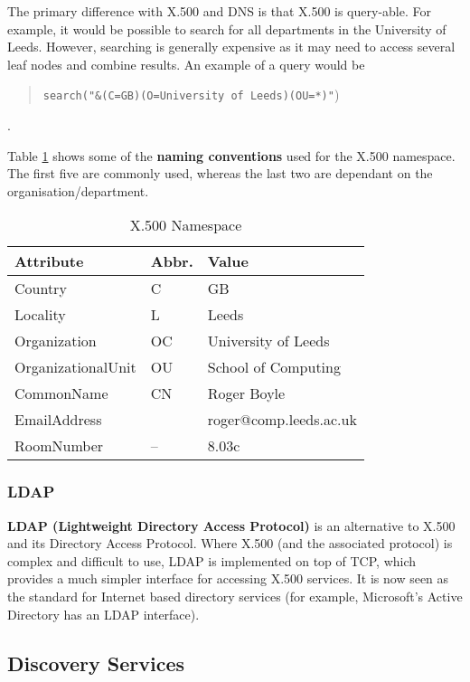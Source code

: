 \documentclass{article}
\begin{document}
The primary difference with X.500 and DNS is that X.500 is query-able. For example, it would be possible to search for all departments in the University of Leeds. However, searching is generally expensive as it may need to access several leaf nodes and combine results. An example of a query would be \begin{quote}\texttt{search("\&(C=GB)(O=University of Leeds)(OU=*)"})\end{quote}.

Table \ref{tab:x500} shows some of the \textbf{naming conventions} used for the X.500 namespace. The first five are commonly used, whereas the last two are dependant on the organisation/department.

\begin{table}
	\centering
	\begin{tabular}{|l|l|l|}
		\hline
		\textbf{Attribute} & \textbf{Abbr.} & \textbf{Value} \\
		\hline
		Country & C & GB \\
		Locality & L & Leeds \\
		Organization & OC & University of Leeds \\
		OrganizationalUnit & OU & School of Computing \\
		CommonName & CN & Roger Boyle \\
		EmailAddress & & roger@comp.leeds.ac.uk \\
		RoomNumber & -- & 8.03c \\
		\hline
	\end{tabular}
	\caption{X.500 Namespace}
	\label{tab:x500}
\end{table}

\subsubsection{LDAP}

\textbf{LDAP (Lightweight Directory Access Protocol)} is an alternative to X.500 and its Directory Access Protocol. Where X.500 (and the associated protocol) is complex and difficult to use, LDAP is implemented on top of TCP, which provides a much simpler interface for accessing X.500 services. It is now seen as the standard for Internet based directory services (for example, Microsoft's Active Directory has an LDAP interface). 

\subsection{Discovery Services}
\end{document}

